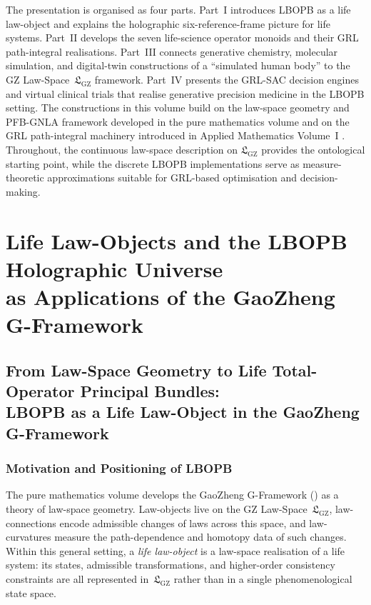 \documentclass[11pt]{book}
\theoremstyle{plain}
\theoremstyle{definition}
\theoremstyle{remark}
\newcommand{\GFramework}{\text{G-Framework}} \newcommand{\GAlgebra}{\text{G-Algebra}}
\newcommand{\GZLS}{\ensuremath{\mathfrak{L}_{\mathrm{GZ}}}}       \newcommand{\GZLT}{\ensuremath{M_{!w}}}                           \newcommand{\GZLOC}{\ensuremath{A_M}}                             \newcommand{\GZLCurv}{\ensuremath{\mathcal{F}_{\mathrm{law}}}}
\begin{document}
The presentation is organised as four parts. Part~I introduces LBOPB
as a life law-object and explains the holographic six-reference-frame
picture for life systems. Part~II develops the seven life-science
operator monoids and their GRL path-integral realisations. Part~III
connects generative chemistry, molecular simulation, and digital-twin
constructions of a ``simulated human body'' to the GZ Law-Space~$\GZLS$
framework. Part~IV presents the GRL-SAC decision engines and virtual
clinical trials that realise generative precision medicine in the
LBOPB setting.
The constructions in this volume build on the law-space geometry and
PFB-GNLA framework developed in the pure mathematics volume
\cite{GaoZheng2025GFramework} and on the GRL path-integral machinery
introduced in Applied Mathematics Volume~I \cite{GaoZhengAppVol1}.
Throughout, the continuous law-space description on $\GZLS$ provides
the ontological starting point, while the discrete LBOPB implementations
serve as measure-theoretic approximations suitable for GRL-based
optimisation and decision-making.



\tableofcontents



\mainmatter



\part[Life Law-Objects and the LBOPB Holographic Universe]{Life Law-Objects and the LBOPB Holographic Universe\\
      as Applications of the GaoZheng G-Framework}

\chapter[From Law-Space Geometry to Life Total-Operator Principal Bundles]{From Law-Space Geometry to Life Total-Operator Principal Bundles:\\
         LBOPB as a Life Law-Object in the GaoZheng G-Framework}


\section{Motivation and Positioning of LBOPB}


The pure mathematics volume develops the GaoZheng G-Framework
(\GFramework) as a theory of law-space geometry. Law-objects live on
the GZ Law-Space~$\GZLS$, law-connections encode admissible changes of
laws across this space, and law-curvatures measure the path-dependence
and homotopy data of such changes. Within this general setting, a
\emph{life law-object} is a law-space realisation of a life system:
its states, admissible transformations, and higher-order consistency
constraints are all represented in~$\GZLS$ rather than in a single
phenomenological state space.
\end{document}
